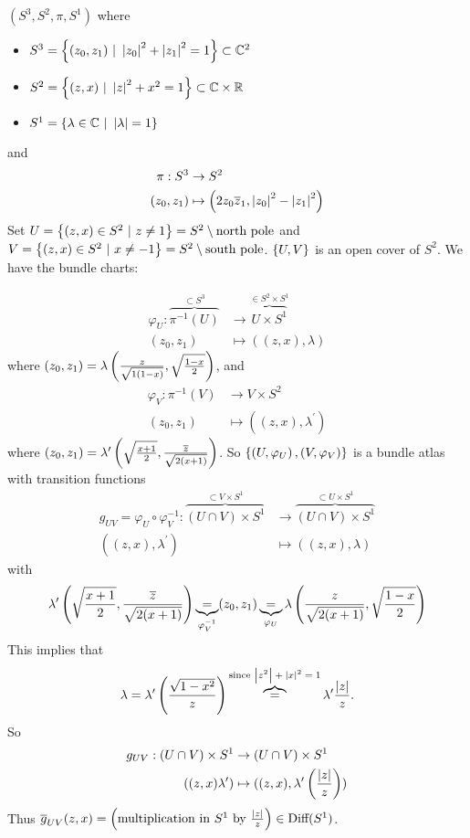\documentclass[main.tex]{subfiles}
\begin{document}
\begin{exmp}
 $(S^3, S^2, \pi, S^1)$ where
\begin{itemize}
    \item $S^3 = \brc{(z_0, z_1) \ | \ \anorm{z_0}^2 + \anorm{z_1}^2 = 1} \subset \C^2$
    \item $S^2 = \left\{ (z,x) \ | \ \left| z \right|^2 + x^2 = 1 \right\} \subset \mathbb{C} \times \mathbb{R}$
    \item $S^1 = \brc{ \lambda \in \C \ | \ \anorm{\lambda} = 1}$
\end{itemize}
and 
\begin{align*}
    \pi: S^3 &\to S^2 \\
    (z_0, z_1) &\mapsto \left( 2z_0\overline{z}_1, \left| z_0 \right|^2 - \left| z_1 \right|^2 \right)
\end{align*}
Set $U = \left\{(z,x) \in S^2 \ | \ z \neq 1\right\} = S^2 \setminus \text{north pole}$ and $V = \left\{ (z,x) \in S^2 \ | \ x \neq -1 \right\} = S^2 \setminus \text{south pole}$. $\left\{U, V\right\}$ is an open cover of $S^2$. We have the bundle charts:

    \begin{align*}
    \varphi_U : \overbrace{\pi^{-1}(U)}^{\subset S^3} &\to \overbrace{U\times S^1}^{\in S^2 \times S^1} \\
    (z_0, z_1) &\mapsto ((z, x), \lambda)
    \end{align*} where $(z_0, z_1) = \lambda\left( \frac{z}{\sqrt{1(1-x)}}, \sqrt{\frac{1-x}{2}} \right)$, and
    \begin{align*}
        \varphi_V : \pi^{-1}(V) &\to V\times S^2 \\
         (z_0, z_1) &\mapsto ((z, x), \lambda^\prime)
     \end{align*} where $(z_0, z_1) = \lambda^\prime \left(  \sqrt{\frac{x+1}{2}}, \frac{\overline{z}}{\sqrt{2(x+1)}}  \right)$.
So $\left\{\left( U, \varphi_U \right), \left(  V, \varphi_V \right)\right\}$ is a bundle atlas with transition functions 
\begin{align*}
g_{UV} = \varphi_U \circ \varphi_V^{-1} : \overbrace{(U \cap V) \times S^1}^{\subset V \times S^1} &\to  \overbrace{(U \cap V) \times S^1}^{\subset U \times S^1} \\
((z, x), \lambda^\prime) &\mapsto ((z,x), \lambda)
\end{align*} with 
\[
\lambda^\prime \left( \sqrt{\frac{x+1}{2}}, \frac{\overline{z}}{\sqrt{2(x+1)}} \right) \underbrace{=}_{\varphi_V^{-1}} (z_0, z_1) \underbrace{=}_{\varphi_U}  \lambda \left(  \frac{z}{{\sqrt{2(x+1)}}}, \sqrt{\frac{1-x}{2} } \right)  
\] This implies that
\[
\lambda = \lambda^\prime \left(  \frac{\sqrt{1-x^2}}{z} \right) \overbrace{=}^{\text{since $\left| z^2 \right|+\left| x \right|^2 = 1$}} \lambda^\prime \frac{\left| z \right|}{z}.
\]
So 
\begin{align*}
    g_{UV} : (U \cap V) \times S^1 &\to (U \cap V) \times S^1 \\
    ((z, x) \lambda^\prime ) &\mapsto ((z,x), \lambda^\prime \left( \frac{\left| z \right|}{z} \right))
\end{align*}
Thus $\overline{g}_{UV}(z,x) = \left( \text{multiplication in $S^1$ by $\frac{\left| z \right|}{z}$} \right) \in \text{Diff}(S^1)$.
\end{exmp}
\end{document}
